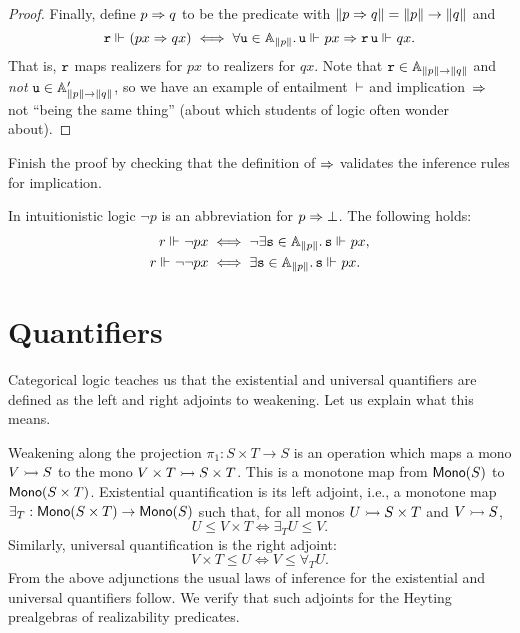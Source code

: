 \begin{proof}
  Finally, define $p \Rightarrow q$ to be the predicate with $\|p \Rightarrow q\| = \|p\| \to \|q\|$ and
  \begin{equation*}
    \mathtt{r} \Vdash_{} (p x \Rightarrow q x)
    \iff
      \forall \mathtt{u} \in \mathbb{A}_{\|p\|} .\,
        \mathtt{u} \Vdash_{} p x
        \Rightarrow
        \mathtt{r}\,\mathtt{u} \Vdash_{} q x.
  \end{equation*}
  That is, $\mathtt{r}$ maps realizers for $p x$ to realizers for $q x$.
  Note that $\mathtt{r} \in \mathbb{A}_{\|p\| \to \|q\|}$ and \emph{not} $\mathtt{u} \in \mathbb{A}'_{\|p\| \to \|q\|}$, so we have an example of entailment~$\vdash$ and implication~$\Rightarrow$ not ``being the same thing'' (about which students of logic often wonder about).
\end{proof}

\begin{exercise}
  Finish the proof by checking that the definition of $\Rightarrow$ validates the inference rules for implication.
\end{exercise}

In intuitionistic logic  $\neg p$ is an abbreviation for $p \Rightarrow \bot$. The following holds:
%
\begin{align*}
  r \Vdash_{} \neg p x
  &\iff
  \lnot \exists \mathtt{s} \in \mathbb{A}_{\|p\|} .\, \mathtt{s} \Vdash_{} p x, \\
  r \Vdash_{} \neg \neg p x
  &\iff
  \exists \mathtt{s} \in \mathbb{A}_{\|p\|} .\, \mathtt{s} \Vdash_{} p x.
\end{align*}


\section{Quantifiers}
\label{sec:quantifiers}

Categorical logic teaches us that the existential and universal quantifiers are defined as the left and right adjoints to weakening. Let us explain what this means.

Weakening along the projection $\pi_1 : S \times T \to S$ is an operation which maps a
mono $V \rightarrowtail S$ to the mono $V \times T \rightarrowtail S \times T$. This is a monotone map
from $\mathsf{Mono}(S)$ to $\mathsf{Mono}(S \times T)$. Existential quantification is its left adjoint,
i.e., a monotone map $\exists_{T} : \mathsf{Mono}(S \times T) \to \mathsf{Mono}(S)$ such that, for all
monos $U \rightarrowtail S \times T$ and $V \rightarrowtail S$,
%
\begin{equation*}
  U \leq V \times T
  \iff
  \exists_{T} U \leq V.
\end{equation*}
%
Similarly, universal quantification is the right adjoint:
%
\begin{equation*}
  V \times T \leq U
  \iff
  V \leq \forall_{T} U.
\end{equation*}
%
From the above adjunctions the usual laws of inference for the existential and universal quantifiers follow. We verify that such adjoints for the Heyting prealgebras of realizability predicates.

